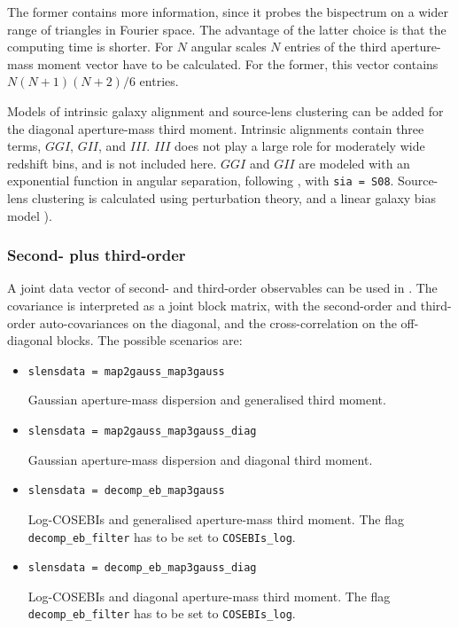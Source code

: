\documentclass[11pt, chapterprefix, headsepline]{scrartcl}
\begin{document}
The former contains more information, since it probes the bispectrum on a wider
range of triangles in Fourier space. The advantage of the latter choice is that
the computing time is shorter. For $N$ angular scales $N$ entries of the third
aperture-mass moment vector have to be calculated. For the former, this vector
contains $N (N+1) (N+2) / 6$ entries.

Models of intrinsic galaxy alignment and source-lens clustering can be added
for the diagonal aperture-mass third moment. Intrinsic alignments contain three
terms, $GGI$, $GII$, and $III$. $III$ does not play a large role for moderately
wide redshift bins, and is not included here. $GGI$ and $GII$ are modeled with
an exponential function in angular separation, following
\cite{2008MNRAS.388..991S}, with \texttt{sia = S08}. Source-lens clustering is calculated using
perturbation theory, and a linear galaxy bias model \citep[\texttt{sslc = slc\_FK13};][]{CFHTLenS-2+3pt}).



\subsubsection{Second- plus third-order}
\label{sec:second_plus_third}

A joint data vector of second- and third-order observables can be used
in \CosmoPMC. The covariance is interpreted as a joint block matrix,
with the second-order and third-order auto-covariances on the
diagonal,
and the cross-correlation on the off-diagonal blocks.
The possible scenarios are:

\begin{itemize}

  \item \texttt{slensdata = map2gauss\_map3gauss}

    Gaussian aperture-mass dispersion and generalised third moment.

  \item \texttt{slensdata = map2gauss\_map3gauss\_diag}

    Gaussian aperture-mass dispersion and diagonal third moment.

  \item \texttt{slensdata = decomp\_eb\_map3gauss}

    Log-COSEBIs and generalised aperture-mass third moment. The flag
    \texttt{decomp\_eb\_filter} has to be set to \texttt{COSEBIs\_log}.

  \item \texttt{slensdata = decomp\_eb\_map3gauss\_diag}

    Log-COSEBIs and diagonal aperture-mass third moment. The flag
    \texttt{decomp\_eb\_filter} has to be set to \texttt{COSEBIs\_log}.

\end{itemize}
\end{document}
